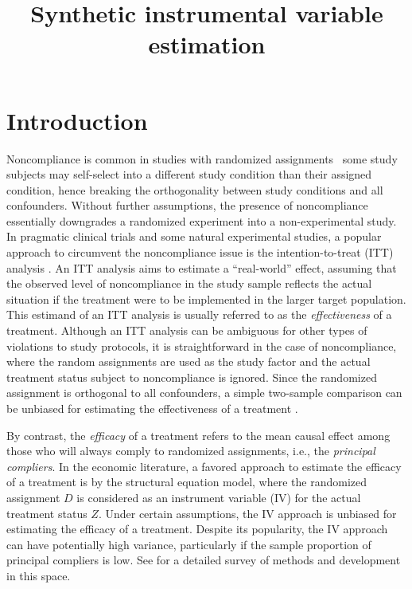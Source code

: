 \documentclass{article}
\title{Synthetic instrumental variable estimation}
\begin{document}
\maketitle

\section{Introduction}


Noncompliance is common in studies with randomized assignments \textemdash ~some study subjects may self-select into a different study condition than their assigned condition, hence breaking the orthogonality between study conditions and all confounders.  Without further assumptions, the presence of noncompliance essentially downgrades a randomized experiment into a non-experimental study.  In pragmatic clinical trials and some natural experimental studies, a popular approach to circumvent the noncompliance issue is the intention-to-treat (ITT) analysis \citep{roland1998understanding, hollis1999meant, heckman2001policy}.  An ITT analysis aims to estimate a ``real-world'' effect, assuming that the observed level of noncompliance in the study sample reflects the actual situation if the treatment were to be implemented in the larger target population. 
This estimand of an ITT analysis is usually referred to as the \textit{effectiveness} of a treatment.  
Although an ITT analysis can be ambiguous for other types of violations to study protocols, it is straightforward in the case of noncompliance, where the random assignments are used as the study factor and the actual treatment status subject to noncompliance is ignored.  Since the randomized assignment is orthogonal to all confounders, a simple two-sample comparison can be unbiased for estimating the effectiveness of a treatment \citep{angrist1999empirical, Little2018}. 

By contrast, the \textit{efficacy} of a treatment refers to the mean causal effect among those who will always comply to randomized assignments, i.e., the \textit{principal compliers}.  In the economic literature, a favored approach to estimate the efficacy of a treatment is by the structural equation model, where the randomized assignment $D$ is considered as an instrument variable (IV) for the actual treatment status $Z$.  Under certain assumptions, the IV approach is unbiased for estimating the efficacy of a treatment.  Despite its popularity, the IV approach can have potentially high variance, particularly if the sample proportion of principal compliers is low.  See \citep{imbens2014instrumental} for a detailed survey of methods and development in this space. 
	
\end{document}
